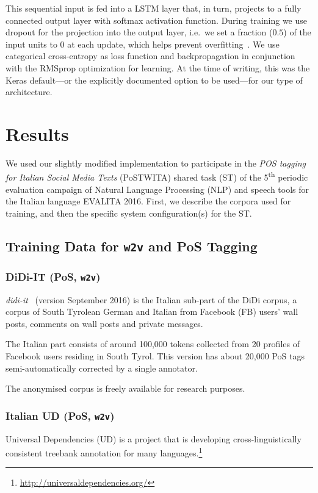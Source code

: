 \documentclass[11pt]{article}
\newcommand\wtv{\texttt{w2v}\xspace}
\begin{document}
This sequential input is fed into a LSTM layer that, in turn, projects to a
fully connected output layer with softmax activation function.
During training we use dropout for the projection into the output layer,
i.e.~we set a fraction ($0.5$) of the input units to 0 at each update, which
helps prevent overfitting~\cite{Srivastava2014}.
We use categorical cross-entropy as loss function and backpropagation in
conjunction with the RMSprop optimization for learning.  
At the time of writing, this was the Keras default---or the explicitly
documented option to be used---for our type of architecture. 


\section{Results} %
\label{sec:results}

We used our slightly modified implementation to participate in the \emph{POS
tagging for Italian Social Media Texts} (PoSTWITA) shared task (ST) of the
5\textsuperscript{th} periodic evaluation campaign of Natural Language
Processing (NLP) and speech tools for the Italian language EVALITA 2016.
First, we describe the corpora used for training, and then the specific system
configuration(s) for the ST.


\subsection{Training Data for \wtv and PoS Tagging} %

\subsubsection{DiDi-IT (PoS, \wtv)} %
\emph{didi-it}~\cite{frey-glaznieks-stemle:2016:didi}
(version September 2016) is the Italian sub-part of the DiDi corpus, a corpus
of South Tyrolean German and Italian from Facebook (FB) users' wall posts,
comments on wall posts and private messages.

The Italian part consists of around 100,000 tokens collected from 20 profiles
of Facebook users residing in South Tyrol.
This version has about 20,000 PoS tags semi-automatically corrected by a single
annotator.

The anonymised corpus is freely available for research purposes.


\subsubsection{Italian UD (PoS, \wtv)} %
Universal Dependencies (UD) is a project that is developing
cross-linguistically consistent treebank annotation for many
languages.\footnote{\url{http://universaldependencies.org/}}
\end{document}
